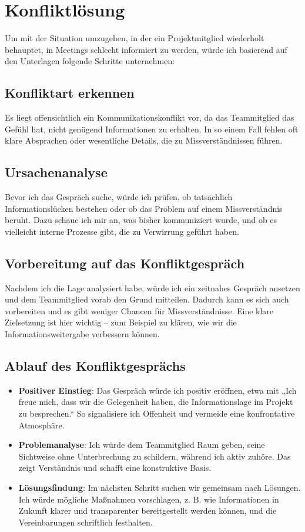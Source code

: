 \section{Konfliktlösung}
Um mit der Situation umzugehen, in der ein Projektmitglied wiederholt behauptet, in Meetings schlecht informiert zu werden, würde ich basierend auf den Unterlagen folgende Schritte unternehmen:

\subsection{Konfliktart erkennen}
Es liegt offensichtlich ein Kommunikationskonflikt vor, da das Teammitglied das Gefühl hat, nicht genügend Informationen zu erhalten. In so einem Fall fehlen oft klare Absprachen oder wesentliche Details, die zu Missverständnissen führen.

\subsection{Ursachenanalyse}
Bevor ich das Gespräch suche, würde ich prüfen, ob tatsächlich Informationslücken bestehen oder ob das Problem auf einem Missverständnis beruht. Dazu schaue ich mir an, was bisher kommuniziert wurde, und ob es vielleicht interne Prozesse gibt, die zu Verwirrung geführt haben.

\subsection{Vorbereitung auf das Konfliktgespräch}
Nachdem ich die Lage analysiert habe, würde ich ein zeitnahes Gespräch ansetzen und dem Teammitglied vorab den Grund mitteilen. Dadurch kann es sich auch vorbereiten und es gibt weniger Chancen für Missverständnisse. Eine klare Zielsetzung ist hier wichtig – zum Beispiel zu klären, wie wir die Informationsweitergabe verbessern können.

\subsection{Ablauf des Konfliktgesprächs}
\begin{itemize}
    \item \textbf{Positiver Einstieg}: Das Gespräch würde ich positiv eröffnen, etwa mit „Ich freue mich, dass wir die Gelegenheit haben, die Informationslage im Projekt zu besprechen.“ So signalisiere ich Offenheit und vermeide eine konfrontative Atmosphäre.
    \item \textbf{Problemanalyse}: Ich würde dem Teammitglied Raum geben, seine Sichtweise ohne Unterbrechung zu schildern, während ich aktiv zuhöre. Das zeigt Verständnis und schafft eine konstruktive Basis.
    \item \textbf{Lösungsfindung}: Im nächsten Schritt suchen wir gemeinsam nach Lösungen. Ich würde mögliche Maßnahmen vorschlagen, z. B. wie Informationen in Zukunft klarer und transparenter bereitgestellt werden können, und die Vereinbarungen schriftlich festhalten.
\end{itemize}

